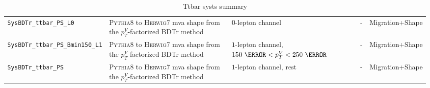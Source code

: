 \begin{table}
{\begin{tabular}{lllll}
      \texttt{SysBDTr\_ttbar\_PS\_L0} & \textsc{Pythia8} to \textsc{Herwig7} mva shape from the $p_T^V$-factorized BDTr method  & $0$-lepton channel & - & Migration+Shape \\
      \texttt{SysBDTr\_ttbar\_PS\_Bmin150\_L1} & \textsc{Pythia8} to \textsc{Herwig7} mva shape from the $p_T^V$-factorized BDTr method  & $1$-lepton channel, $150~\GeV< p_T^V <250~\GeV$ & - & Migration+Shape \\
      \texttt{SysBDTr\_ttbar\_PS} & \textsc{Pythia8} to \textsc{Herwig7} mva shape from the $p_T^V$-factorized BDTr method  & $1$-lepton channel, rest & - & Migration+Shape \\
\bottomrule
\end{tabular}
}
\caption[A summary of systematic uncertainties on the $t\bar{t}$ process.]{Ttbar
  systs summary}
\label{tab:ttbar_systematics}
\end{table}